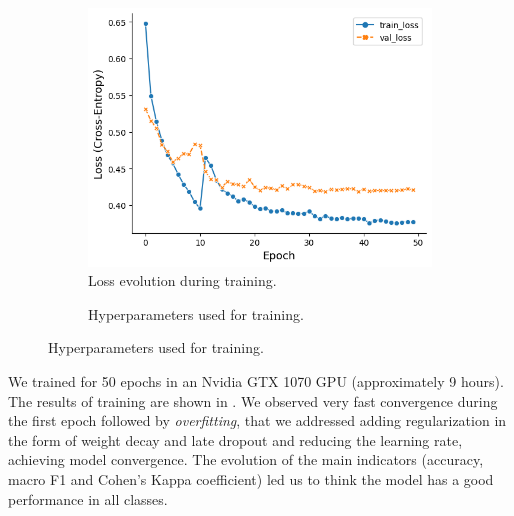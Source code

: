 \begin{figure}[tb]
     \begin{subfigure}[b]{0.65\textwidth}
        \centering
        \includegraphics[width=\textwidth]{figures/chapter5/metrics/loss.png}
        \caption{Loss evolution during training.}
        \label{fig:training}
    \end{subfigure}
    \hfill
    \begin{subfigure}[b]{0.34\textwidth}
        \centering

        \caption{Hyperparameters used for training.}
        \label{table:adamax}
    \end{subfigure}
\end{figure}

We trained for 50 epochs in an Nvidia GTX 1070 GPU (approximately 9 hours). The results of training are shown in . We observed very fast convergence during the first epoch followed by \textit{overfitting}, that we addressed adding regularization in the form of weight decay and late dropout \cite{liu2023dropout} and reducing the learning rate, achieving model convergence. The evolution of the main indicators (accuracy, macro F1 and Cohen's Kappa coefficient) led us to think the model has a good performance in all classes. 

